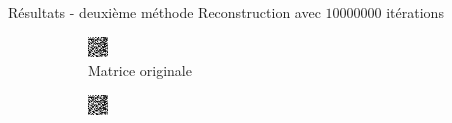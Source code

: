 \documentclass{beamer}
\begin{document}
\begin{frame}{Résultats - deuxième méthode}
    Reconstruction avec $10 000 000$ itérations
    \begin{figure}[t]
        \centering
        \begin{subfigure}[b]{0.35\textwidth}
            \includegraphics[width=\textwidth]{matOriginale10000.png}
            \caption{Matrice originale}
        \end{subfigure}
        \qquad \qquad 
        \pause
        \begin{subfigure}[b]{0.35\textwidth}
            \includegraphics[width=\textwidth]{matReconstruction10000.png}

\end{subfigure}
\end{figure}
\end{frame}
\end{document}
